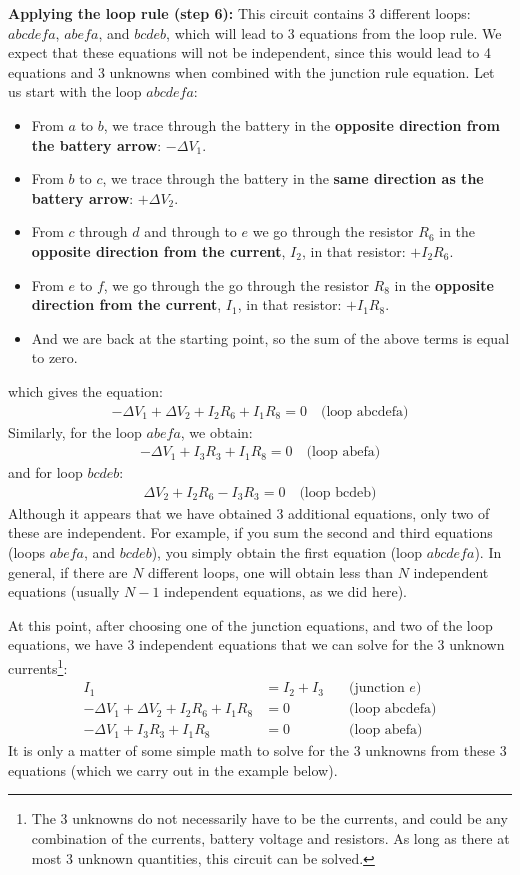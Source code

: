 \textbf{Applying the loop rule (step 6): } This circuit contains 3 different loops: $abcdefa$, $abefa$, and $bcdeb$, which will lead to 3 equations from the loop rule. We expect that these equations will not be independent, since this would lead to 4 equations and 3 unknowns when combined with the junction rule equation. Let us start with the loop $abcdefa$:
\begin{itemize}
\item From $a$ to $b$, we trace through the battery in the \textbf{opposite direction from the battery arrow}: $-\Delta V_1$.
\item From $b$ to $c$, we trace through the battery in the \textbf{same direction as the battery arrow}: $+\Delta V_2$.
\item From $c$ through $d$ and through to $e$ we go through the resistor $R_6$ in the \textbf{opposite direction from the current}, $I_2$, in that resistor: $+I_2R_6$.
\item From $e$ to $f$, we go through the go through the resistor $R_8$ in the \textbf{opposite direction from the current}, $I_1$, in that resistor: $+I_1R_8$.
\item And we are back at the starting point, so the sum of the above terms is equal to zero.
\end{itemize}
which gives the equation:
\begin{align*}
-\Delta V_1+\Delta V_2+I_2R_6+I_1R_8=0\quad\text{(loop abcdefa)}
\end{align*}
Similarly, for the loop $abefa$, we obtain:
\begin{align*}
-\Delta V_1+I_3R_3+I_1R_8=0\quad\text{(loop abefa)}
\end{align*}
and for loop $bcdeb$:
\begin{align*}
\Delta V_2+I_2R_6-I_3R_3=0\quad\text{(loop bcdeb)}
\end{align*}
Although it appears that we have obtained 3 additional equations, only two of these are independent. For example, if you sum the second and third equations (loops $abefa$, and $bcdeb$), you simply obtain the first equation (loop $abcdefa$). In general, if there are $N$ different loops, one will obtain less than $N$ independent equations (usually $N-1$ independent equations, as we did here).

At this point, after choosing one of the junction equations, and two of the loop equations, we have 3 independent equations that we can solve for the 3 unknown currents\footnote{The 3 unknowns do not necessarily have to be the currents, and could be any combination of the currents, battery voltage and resistors. As long as there at most 3 unknown quantities, this circuit can be solved.}:
\begin{align*}
I_1 &= I_2+I_3 \quad &\text{(junction $e$)}\\
-\Delta V_1+\Delta V_2+I_2R_6+I_1R_8&=0\quad&\text{(loop abcdefa)}\\
-\Delta V_1+I_3R_3+I_1R_8&=0\quad&\text{(loop abefa)}
\end{align*}
It is only a matter of some simple math to solve for the 3 unknowns from these 3 equations (which we carry out in the example below). 

